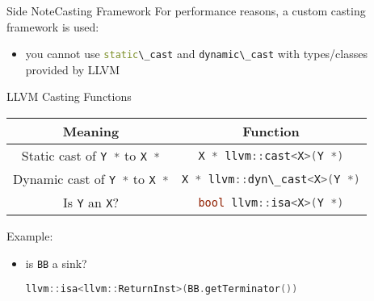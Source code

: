 \documentclass[10pt,mathserif]{beamer}
\newcommand{\cppinline}[1]{\lstinline[language=C++]!#1!}
\begin{document}
\begin{frame}{Side Note}{Casting Framework}
For performance reasons, a custom casting framework is used:

\begin{itemize}
\item you cannot use \cppinline{static\_cast} and \cppinline{dynamic\_cast} with
      types/classes provided by LLVM
\end{itemize}

\begin{block}{LLVM Casting Functions}
\centering
\begin{tabular}{cc}
\toprule

\multicolumn{1}{c}{\textbf{Meaning}}   &
\multicolumn{1}{c}{\textbf{Function}} \\

\midrule

Static cast of \cppinline{Y *} to \cppinline{X *}  &
\cppinline{X * llvm::cast<X>(Y *)}                \\

Dynamic cast of \cppinline{Y *} to \cppinline{X *}  &
\cppinline{X * llvm::dyn\_cast<X>(Y *)}            \\

Is \cppinline{Y} an \cppinline{X}?  &
\cppinline{bool llvm::isa<X>(Y *)} \\

\bottomrule
\end{tabular}
\end{block}

Example:

\begin{itemize}
\item is \cppinline{BB} a sink?
      \begin{center}
      \cppinline{llvm::isa<llvm::ReturnInst>(BB.getTerminator())}
      \end{center}
\end{itemize}
\end{frame}
\end{document}
